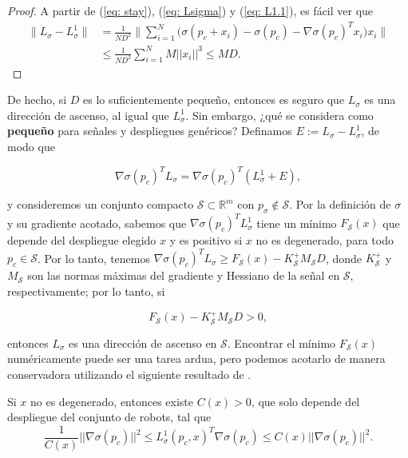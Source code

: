 \begin{proof}
A partir de (\ref{eq: stay}), (\ref{eq: Lsigma}) y (\ref{eq: L1.1}), es fácil ver que
\begin{align}
    \|L_\sigma - L^1_\sigma\| &= \frac{1}{ND^2} \Bigg\|\sum_{i=1}^N \Big(\sigma(p_c + x_i) - \sigma(p_c) - \nabla\sigma(p_c)^Tx_i\Big)x_i\Bigg\| \nonumber \\
    &\leq \frac{1}{ND^2}\sum_{i=1}^N M||x_i||^3 \leq MD. \nonumber
\end{align}
\end{proof}


De hecho, si $D$ es lo suficientemente pequeño, entonces es seguro que $L_\sigma$ es una dirección de ascenso, al igual que $L_\sigma^1$. Sin embargo, ¿qué se considera como \textbf{pequeño} para señales y despliegues genéricos? Definamos $E := L_\sigma - L_\sigma^1$, de modo que

\begin{equation}
\nabla \sigma(p_c)^T L_\sigma = \nabla \sigma(p_c)^T (L_\sigma^1 + E),
\end{equation}

y consideremos un conjunto compacto $\mathcal{S} \subset \mathbb{R}^m$ con $p_\sigma \notin \mathcal{S}$. Por la definición de $\sigma$ y su gradiente acotado, sabemos que $\nabla \sigma(p_c)^T L_\sigma^1$ tiene un mínimo $F_\mathcal{S}(x)$ que depende del despliegue elegido $x$ y es positivo si $x$ no es degenerado, para todo $p_c \in \mathcal{S}$. Por lo tanto, tenemos $\nabla \sigma(p_c)^T L_\sigma \geq F_\mathcal{S}(x) - K_\mathcal{S}^+ M_\mathcal{S} D$, donde $K_\mathcal{S}^+$ y $M_\mathcal{S}$ son las normas máximas del gradiente y Hessiano de la señal en $\mathcal{S}$, respectivamente; por lo tanto, si

\begin{equation}
\label{eq: xiD}
F_\mathcal{S}(x) - K_\mathcal{S}^+ M_\mathcal{S} D > 0,
\end{equation}

entonces $L_\sigma$ es una dirección de ascenso en $\mathcal{S}$. Encontrar el mínimo $F_\mathcal{S}(x)$ numéricamente puede ser una tarea ardua, pero podemos acotarlo de manera conservadora utilizando el siguiente resultado de \cite{tfg_antonio}.

\newpage

\begin{lemma}
\label{lem: gradD}
Si $x$ no es degenerado, entonces existe $C(x) > 0$, que solo depende del despliegue del conjunto de robots, tal que
\begin{equation}
\frac{1}{C(x)}||\nabla\sigma(p_c)||^2 \leq L^1_\sigma(p_c, x)^T\nabla\sigma(p_c) \leq C(x) ||\nabla\sigma(p_c)||^2. \nonumber
\end{equation}
\end{lemma}

